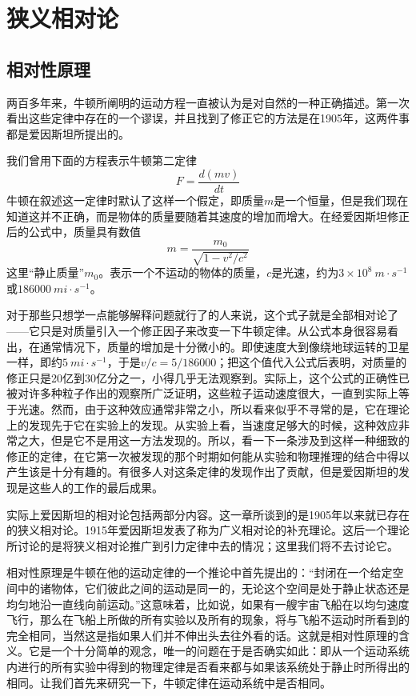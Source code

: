 \chapter{狭义相对论}

\section{相对性原理}

两百多年来，牛顿所阐明的运动方程一直被认为是对自然的一种正确描述。第一次看出这些定律中存在的一个谬误，并且找到了修正它的方法是在1905年，这两件事都是爱因斯坦所提出的。

我们曾用下面的方程表示牛顿第二定律
\begin{equation*}
    F=\frac{d(mv)}{dt}
\end{equation*}
牛顿在叙述这一定律时默认了这样一个假定，即质量$m$是一个恒量，但是我们现在知道这并不正确，而是物体的质量要随着其速度的增加而增大。在经爱因斯坦修正后的公式中，质量具有数值
\begin{equation}
    \label{Eq:I:15:1}
    m=\frac{m_0}{\sqrt{1-v^2/c^2}}
\end{equation}
这里“静止质量”$m_0$。表示一个不运动的物体的质量，$c$是光速，约为$3 \times 10^8~m \cdot s^{-1}$或$186000~mi \cdot s^{-1}$。

对于那些只想学一点能够解释问题就行了的人来说，这个式子就是全部相对论了——它只是对质量引入一个修正因子来改变一下牛顿定律。从公式本身很容易看出，在通常情况下，质量的增加是十分微小的。即使速度大到像绕地球运转的卫星一样，即约$5~mi \cdot s^{-1}$，于是$v/c=5/186000$；把这个值代入公式后表明，对质量的修正只是20亿到30亿分之一，小得几乎无法观察到。实际上，这个公式的正确性已被对许多种粒子作出的观察所广泛证明，这些粒子运动速度很大，一直到实际上等于光速。然而，由于这种效应通常非常之小，所以看来似乎不寻常的是，它在理论上的发现先于它在实验上的发现。从实验上看，当速度足够大的时候，这种效应非常之大，但是它不是用这一方法发现的。所以，看一下一条涉及到这样一种细致的修正的定律，在它第一次被发现的那个时期如何能从实验和物理推理的结合中得以产生该是十分有趣的。有很多人对这条定律的发现作出了贡献，但是爱因斯坦的发现是这些人的工作的最后成果。

实际上爱因斯坦的相对论包括两部分内容。这一章所谈到的是1905年以来就已存在的狭义相对论。1915年爱因斯坦发表了称为广义相对论的补充理论。这后一个理论所讨论的是将狭义相对论推广到引力定律中去的情况；这里我们将不去讨论它。

相对性原理是牛顿在他的运动定律的一个推论中首先提出的：“封闭在一个给定空间中的诸物体，它们彼此之间的运动是同一的，无论这个空间是处于静止状态还是均匀地沿一直线向前运动。”这意味着，比如说，如果有一艘宇宙飞船在以均匀速度飞行，那么在飞船上所做的所有实验以及所有的现象，将与飞船不运动时所看到的完全相同，当然这是指如果人们并不伸出头去往外看的话。这就是相对性原理的含义。它是一个十分简单的观念，唯一的问题在于是否确实如此：即从一个运动系统内进行的所有实验中得到的物理定律是否看来都与如果该系统处于静止时所得出的相同。让我们首先来研究一下，牛顿定律在运动系统中是否相同。

